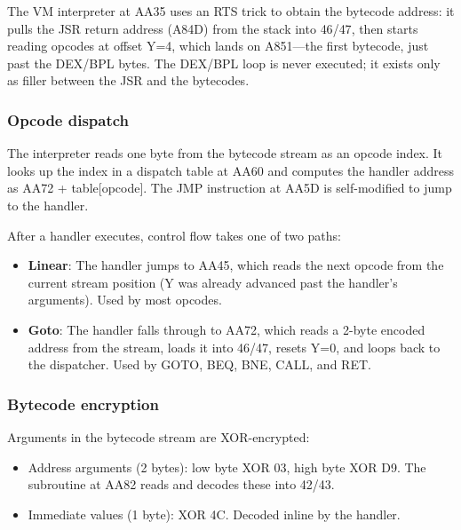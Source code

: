 \documentclass[10pt]{report}
\begin{document}
The VM interpreter at {\Tt{}{\$}AA35\nwendquote} uses an RTS trick to obtain the bytecode
address: it pulls the JSR return address ({\Tt{}{\$}A84D\nwendquote}) from the stack into
{\Tt{}{\$}46\nwendquote}/{\Tt{}{\$}47\nwendquote}, then starts reading opcodes at offset {\Tt{}Y=4\nwendquote}, which lands on
{\Tt{}{\$}A851\nwendquote}---the first bytecode, just past the {\Tt{}DEX\nwendquote}/{\Tt{}BPL\nwendquote} bytes. The {\Tt{}DEX\nwendquote}/{\Tt{}BPL\nwendquote}
loop is never executed; it exists only as filler between the {\Tt{}JSR\nwendquote} and the bytecodes.

\subsubsection{Opcode dispatch}

The interpreter reads one byte from the bytecode stream as an opcode index.
It looks up the index in a dispatch table at {\Tt{}{\$}AA60\nwendquote} and computes the handler
address as {\Tt{}{\$}AA72\nwendquote} + table[opcode]. The {\Tt{}JMP\nwendquote} instruction at {\Tt{}{\$}AA5D\nwendquote} is
self-modified to jump to the handler.

After a handler executes, control flow takes one of two paths:
\begin{itemize}
  \item \textbf{Linear}: The handler jumps to {\Tt{}{\$}AA45\nwendquote}, which reads the next
        opcode from the current stream position (Y was already advanced past
        the handler's arguments). Used by most opcodes.
  \item \textbf{Goto}: The handler falls through to {\Tt{}{\$}AA72\nwendquote}, which reads
        a 2-byte encoded address from the stream, loads it into {\Tt{}{\$}46\nwendquote}/{\Tt{}{\$}47\nwendquote},
        resets {\Tt{}Y=0\nwendquote}, and loops back to the dispatcher. Used by {\Tt{}GOTO\nwendquote}, {\Tt{}BEQ\nwendquote},
        {\Tt{}BNE\nwendquote}, {\Tt{}CALL\nwendquote}, and {\Tt{}RET\nwendquote}.
\end{itemize}

\subsubsection{Bytecode encryption}

Arguments in the bytecode stream are XOR-encrypted:
\begin{itemize}
  \item Address arguments (2 bytes): low byte XOR {\Tt{}{\$}03\nwendquote}, high byte XOR {\Tt{}{\$}D9\nwendquote}.
        The subroutine at {\Tt{}{\$}AA82\nwendquote} reads and decodes these into {\Tt{}{\$}42\nwendquote}/{\Tt{}{\$}43\nwendquote}.
  \item Immediate values (1 byte): XOR {\Tt{}{\$}4C\nwendquote}. Decoded inline by the handler.
\end{itemize}
\end{document}
